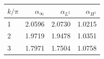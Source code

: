 \begin{tabular}{lrrr}
\toprule
\(k/\pi\) & \(\alpha_\infty\) & \(\alpha_{L^2}\) & \(\alpha_{H^1}\) \\
\midrule
1 & 2.0596 & 2.0730 & 1.0215 \\
2 & 1.9719 & 1.9478 & 1.0351 \\
3 & 1.7971 & 1.7504 & 1.0758 \\
\bottomrule
\end{tabular}
